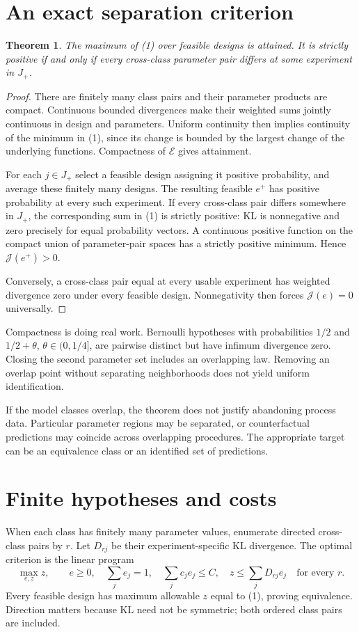 \documentclass[11pt,a4paper]{article}
\newtheorem{theorem}{Theorem}[section]
\begin{document}
\section{An exact separation criterion}
\begin{theorem}
The maximum of (1) over feasible designs is attained. It is strictly positive if and only if every cross-class parameter pair differs at some experiment in $J_+$.
\end{theorem}
\begin{proof}
There are finitely many class pairs and their parameter products are compact. Continuous bounded divergences make their weighted sums jointly continuous in design and parameters. Uniform continuity then implies continuity of the minimum in (1), since its change is bounded by the largest change of the underlying functions. Compactness of $\mathcal E$ gives attainment.

For each $j\in J_+$ select a feasible design assigning it positive probability, and average these finitely many designs. The resulting feasible $e^+$ has positive probability at every such experiment. If every cross-class pair differs somewhere in $J_+$, the corresponding sum in (1) is strictly positive: KL is nonnegative and zero precisely for equal probability vectors. A continuous positive function on the compact union of parameter-pair spaces has a strictly positive minimum. Hence $\mathcal J(e^+)>0$.

Conversely, a cross-class pair equal at every usable experiment has weighted divergence zero under every feasible design. Nonnegativity then forces $\mathcal J(e)=0$ universally.
\end{proof}
Compactness is doing real work. Bernoulli hypotheses with probabilities $1/2$ and $1/2+\theta$, $\theta\in(0,1/4]$, are pairwise distinct but have infimum divergence zero. Closing the second parameter set includes an overlapping law. Removing an overlap point without separating neighborhoods does not yield uniform identification.

If the model classes overlap, the theorem does not justify abandoning process data. Particular parameter regions may be separated, or counterfactual predictions may coincide across overlapping procedures. The appropriate target can be an equivalence class or an identified set of predictions.
\section{Finite hypotheses and costs}
When each class has finitely many parameter values, enumerate directed cross-class pairs by $r$. Let $D_{rj}$ be their experiment-specific KL divergence. The optimal criterion is the linear program
\[
 \max_{e,z}z,\qquad
 e\ge0,\quad\sum_je_j=1,\quad\sum_jc_je_j\le C,\quad
 z\le\sum_jD_{rj}e_j\quad\text{for every }r.
 \tag{2}
\]
Every feasible design has maximum allowable $z$ equal to (1), proving equivalence. Direction matters because KL need not be symmetric; both ordered class pairs are included.
\end{document}
